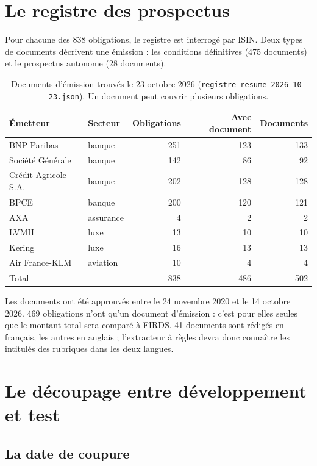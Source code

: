 \documentclass[11pt,a4paper]{article}
\begin{document}
\section{Le registre des prospectus}

Pour chacune des 838 obligations, le registre est interrogé par ISIN. Deux types de documents décrivent une émission : les conditions définitives (475 documents) et le prospectus autonome (28 documents).

\begin{table}[H]
\small
\begin{tabularx}{\linewidth}{Ylrrr}
\toprule
\textbf{Émetteur} & \textbf{Secteur} & \textbf{Obligations} & \textbf{Avec document} & \textbf{Documents} \\
\midrule
BNP Paribas & banque & 251 & 123 & 133 \\
Société Générale & banque & 142 & 86 & 92 \\
Crédit Agricole S.A. & banque & 202 & 128 & 128 \\
BPCE & banque & 200 & 120 & 121 \\
AXA & assurance & 4 & 2 & 2 \\
LVMH & luxe & 13 & 10 & 10 \\
Kering & luxe & 16 & 13 & 13 \\
Air France-KLM & aviation & 10 & 4 & 4 \\
\midrule
Total & & 838 & 486 & 502 \\
\bottomrule
\end{tabularx}
\caption{Documents d'émission trouvés le 23 octobre 2026 (\texttt{registre-resume-2026-10-23.json}). Un document peut couvrir plusieurs obligations.}
\end{table}

Les documents ont été approuvés entre le 24 novembre 2020 et le 14 octobre 2026. 469 obligations n'ont qu'un document d'émission : c'est pour elles seules que le montant total sera comparé à FIRDS. 41 documents sont rédigés en français, les autres en anglais ; l'extracteur à règles devra donc connaître les intitulés des rubriques dans les deux langues.

\section{Le découpage entre développement et test}

\subsection{La date de coupure}
\end{document}
